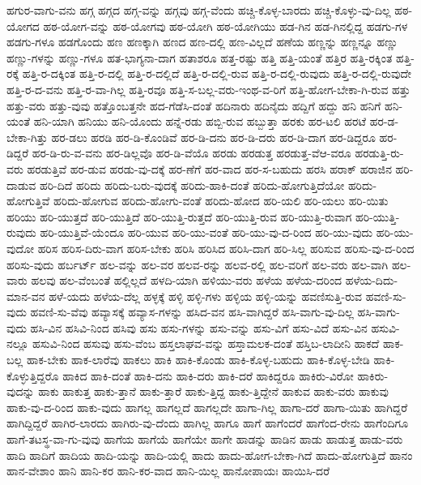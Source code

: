 {ಹಗುರ-ವಾಗು-ವನು
ಹಗ್ಗ
ಹಗ್ಗದ
ಹಗ್ಗ-ವನ್ನು
ಹಗ್ಗವು
ಹಗ್ಗ-ವೆಂದು
ಹಚ್ಚಿ-ಕೊಳ್ಳ-ಬಾರದು
ಹಚ್ಚಿ-ಕೊಳ್ಳು-ವು-ದಿಲ್ಲ
ಹಠ-ಯೋಗದ
ಹಠ-ಯೋಗ-ವನ್ನು
ಹಠ-ಯೋಗವು
ಹಠ-ಯೋಗಿ
ಹಠ-ಯೋಗಿಯು
ಹಡ-ಗಿನ
ಹಡ-ಗಿನಲ್ಲಿದ್ದ
ಹಡಗು-ಗಳ
ಹಡಗು-ಗಳೂ
ಹಡಗೊಂದು
ಹಣ
ಹಣಕ್ಕಾಗಿ
ಹಣದ
ಹಣ-ದಲ್ಲಿ
ಹಣ-ವಿಲ್ಲದೆ
ಹಣೆಯ
ಹಣ್ಣನ್ನು
ಹಣ್ಣನ್ನೂ
ಹಣ್ಣು
ಹಣ್ಣು-ಗಳನ್ನು
ಹಣ್ಣು-ಗಳೂ
ಹತ-ಭಾಗ್ಯನಾ-ದಾಗ
ಹತಾಶರೂ
ಹತ್ತ-ರಷ್ಟು
ಹತ್ತಿ
ಹತ್ತಿ-ಯಂತೆ
ಹತ್ತಿರ
ಹತ್ತಿ-ರಕ್ಕಿಂತ
ಹತ್ತಿ-ರಕ್ಕೆ
ಹತ್ತಿ-ರ-ದಕ್ಕಿಂತ
ಹತ್ತಿ-ರ-ದಲ್ಲಿ
ಹತ್ತಿ-ರ-ದಲ್ಲಿದೆ
ಹತ್ತಿ-ರ-ದಲ್ಲಿ-ರುವ
ಹತ್ತಿ-ರ-ದಲ್ಲಿ-ರುವುದು
ಹತ್ತಿ-ರ-ದಲ್ಲಿ-ರುವುದೇ
ಹತ್ತಿ-ರ-ದ-ವನು
ಹತ್ತಿ-ರ-ವಾ-ಗಿಲ್ಲ
ಹತ್ತಿ-ರವೂ
ಹತ್ತಿ-ಸ-ಬಲ್ಲ-ವರು-ಇಂಥ-ವ-ರಿಗೆ
ಹತ್ತಿ-ಹೋಗ-ಬೇಕಾ-ಗಿ-ರುವ
ಹತ್ತು
ಹತ್ತು-ವರು
ಹತ್ತು-ವುವು
ಹತ್ತೊಂಬತ್ತನೇ
ಹದ-ಗೆಡೆಸಿ-ದಂತೆ
ಹದಿನಾರು
ಹದಿನೈದು
ಹದ್ದಿಗೆ
ಹದ್ದು
ಹನಿ
ಹನಿಗೆ
ಹನಿ-ಯಂತೆ
ಹನಿ-ಯಾಗಿ
ಹನಿಯು
ಹನಿ-ಯೊಂದು
ಹನ್ನೆ-ರಡು
ಹಬ್ಬಿ-ರುವ
ಹಬ್ಬುತ್ತಾ
ಹರಕು
ಹರ-ಟಲಿ
ಹರಟೆ
ಹರ-ಡ-ಬೇಕಾ-ಗಿತ್ತು
ಹರ-ಡಲು
ಹರಡಿ
ಹರ-ಡಿ-ಕೊಂಡಿವೆ
ಹರ-ಡಿ-ದನು
ಹರ-ಡಿ-ದರು
ಹರ-ಡಿ-ದಾಗ
ಹರ-ಡಿದ್ದರೂ
ಹರ-ಡಿದ್ದರೆ
ಹರ-ಡಿ-ರು-ವ-ವನು
ಹರ-ಡಿಲ್ಲವೊ
ಹರ-ಡಿ-ವೆಯೊ
ಹರಡು
ಹರಡುತ್ತ
ಹರಡುತ್ತ-ವೆಆ-ವರೂ
ಹರಡುತ್ತಿ-ರು-ವರು
ಹರಡುತ್ತಿವೆ
ಹರ-ಡುವ
ಹರಡು-ವು-ದಕ್ಕೆ
ಹರ-ಣೆಗೆ
ಹರ-ವಾದ
ಹರ-ಸ-ಬಹುದು
ಹರಸಿ
ಹರಾಕ್
ಹರಾಜಿನ
ಹರಿ-ದಾಡುವ
ಹರಿ-ದಿದೆ
ಹರಿದು
ಹರಿದು-ಬರು-ವುದಕ್ಕೆ
ಹರಿದು-ಹಾಕಿ-ದಂತೆ
ಹರಿದು-ಹೋಗುತ್ತಿದೆಯೋ
ಹರಿದು-ಹೋಗುತ್ತಿವೆ
ಹರಿದು-ಹೋಗುವ
ಹರಿದು-ಹೋಗು-ವಂತೆ
ಹರಿದು-ಹೋದ
ಹರಿ-ಯಲಿ
ಹರಿ-ಯಲು
ಹರಿ-ಯಿತು
ಹರಿಯು
ಹರಿ-ಯುತ್ತದೆ
ಹರಿ-ಯುತ್ತಿದೆ
ಹರಿ-ಯುತ್ತಿ-ರುತ್ತದೆ
ಹರಿ-ಯುತ್ತಿ-ರುವ
ಹರಿ-ಯುತ್ತಿ-ರುವಾಗ
ಹರಿ-ಯುತ್ತಿ-ರುವುದು
ಹರಿ-ಯುತ್ತಿವೆ-ಯೆಂದೂ
ಹರಿ-ಯುವ
ಹರಿ-ಯು-ವಂತೆ
ಹರಿ-ಯು-ವು-ದ-ರಿಂದ
ಹರಿ-ಯು-ವುದು
ಹರಿ-ಯು-ವುದೋ
ಹರಿಸ
ಹರಿಸ-ದಿರು-ವಾಗ
ಹರಿಸ-ಬೇಕು
ಹರಿಸಿ
ಹರಿಸಿದ
ಹರಿಸಿ-ದಾಗ
ಹರಿ-ಸಿಲ್ಲ
ಹರಿಸುವ
ಹರಿಸು-ವು-ದ-ರಿಂದ
ಹರಿಸು-ವುದು
ಹರ್ಬರ್ಟ್
ಹಲ-ವನ್ನು
ಹಲ-ವರ
ಹಲವ-ರನ್ನು
ಹಲವ-ರಲ್ಲಿ
ಹಲ-ವರಿಗೆ
ಹಲ-ವರು
ಹಲ-ವಾಗಿ
ಹಲ-ವಾರು
ಹಲವು
ಹಲ-ವೆಂಬಂತೆ
ಹಲ್ಲಿಲ್ಲದೆ
ಹಳದಿ-ಯಾಗಿ
ಹಳಿಯು-ವರು
ಹಳೆಯ
ಹಳೆಯ-ದರಿಂದ
ಹಳೆಯ-ದಿದು-ಮಾನ-ವನ
ಹಳೆ-ಯದು
ಹಳೆಯ-ದೆಲ್ಲ
ಹಳ್ಳಕ್ಕೆ
ಹಳ್ಳಿ
ಹಳ್ಳಿ-ಗಳು
ಹಳ್ಳಿಯ
ಹಳ್ಳಿ-ಯನ್ನು
ಹವಣಿಸುತ್ತಿ-ರುವ
ಹವಣಿ-ಸು-ವುದು
ಹವಣಿ-ಸು-ವೆವು
ಹವ್ಯಾಸಕ್ಕೆ
ಹವ್ಯಾಸ-ಗಳನ್ನು
ಹಸಿದ-ವನ
ಹಸಿ-ವಾಗಿದ್ದರೆ
ಹಸಿ-ವಾಗು-ವು-ದಿಲ್ಲ
ಹಸಿ-ವಾಗು-ವುದು
ಹಸಿ-ವಿನ
ಹಸಿವಿ-ನಿಂದ
ಹಸಿವು
ಹಸು
ಹಸು-ಗಳನ್ನು
ಹಸು-ವನ್ನು
ಹಸು-ವಿಗೆ
ಹಸು-ವಿದೆ
ಹಸು-ವಿನ
ಹಸುವಿ-ನಲ್ಲೂ
ಹಸುವಿ-ನಿಂದ
ಹಸುವು
ಹಸು-ವೆಂಬ
ಹಸ್ತಲಾಘವ-ವನ್ನು
ಹಸ್ತಾಮಲಕ-ದಂತೆ
ಹಸ್ತಿಬ-ಲಾದೀನಿ
ಹಾಕದೆ
ಹಾಕ-ಬಲ್ಲ
ಹಾಕ-ಬೇಕು
ಹಾಕ-ಲಾರೆವು
ಹಾಕಲು
ಹಾಕಿ
ಹಾಕಿ-ಕೊಂಡು
ಹಾಕಿ-ಕೊಳ್ಳ-ಬಹುದು
ಹಾಕಿ-ಕೊಳ್ಳ-ಬೇಡಿ
ಹಾಕಿ-ಕೊಳ್ಳುತ್ತಿದ್ದರೊ
ಹಾಕಿದ
ಹಾಕಿ-ದಂತೆ
ಹಾಕಿ-ದನು
ಹಾಕಿ-ದರು
ಹಾಕಿ-ದರೆ
ಹಾಕಿದ್ದರೂ
ಹಾಕಿರು-ವಿರೋ
ಹಾಕಿರು-ವುದನ್ನು
ಹಾಕು
ಹಾಕುತ್ತ
ಹಾಕು-ತ್ತಾನೆ
ಹಾಕು-ತ್ತಾರೆ
ಹಾಕು-ತ್ತಿದ್ದ
ಹಾಕು-ತ್ತಿದ್ದೇನೆ
ಹಾಕುವ
ಹಾಕು-ವರು
ಹಾಕುವು
ಹಾಕು-ವು-ದ-ರಿಂದ
ಹಾಕು-ವುದು
ಹಾಗಲ್ಲ
ಹಾಗಲ್ಲದೆ
ಹಾಗಲ್ಲದೇ
ಹಾಗಾ-ಗಿಲ್ಲ
ಹಾಗಾ-ದರೆ
ಹಾಗಾ-ಯಿತು
ಹಾಗಿದ್ದರೆ
ಹಾಗಿದ್ದಿದ್ದರೆ
ಹಾಗಿರ-ಲಾರದು
ಹಾಗಿರು-ವು-ದೆಂದು
ಹಾಗಿಲ್ಲ
ಹಾಗೂ
ಹಾಗೆ
ಹಾಗೆಂದರೆ
ಹಾಗೆಂದ-ರೇನು
ಹಾಗೆಂದಿಗೂ
ಹಾಗೆ-ತಟಸ್ಥ-ವಾ-ಗು-ವುವು
ಹಾಗೆಯ
ಹಾಗೆಯೆ
ಹಾಗೆಯೇ
ಹಾಗೇ
ಹಾಡನ್ನು
ಹಾಡಿನ
ಹಾಡು
ಹಾಡುತ್ತ
ಹಾಡು-ವರು
ಹಾದಿ
ಹಾದಿಗೆ
ಹಾದಿಯ
ಹಾದಿ-ಯನ್ನು
ಹಾದಿ-ಯಲ್ಲಿ
ಹಾದು
ಹಾದು-ಹೋಗ-ಬೇಕಾ-ಗಿದೆ
ಹಾದು-ಹೋಗುತ್ತಿದೆ
ಹಾನಂ
ಹಾನ-ವೇಶಾಂ
ಹಾನಿ
ಹಾನಿ-ಕರ
ಹಾನಿ-ಕರ-ವಾದ
ಹಾನಿ-ಯಿಲ್ಲ
ಹಾನೋಪಾಯಃ
ಹಾಯಿಸಿ-ದರೆ
}
